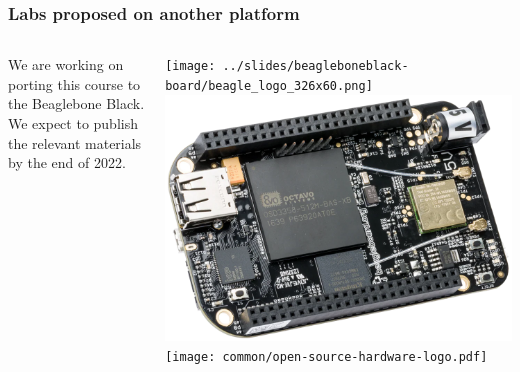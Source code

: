 \begin{frame}
\frametitle{Labs proposed on another platform}
  \begin{columns}
    We are working on porting this course to the Beaglebone Black.\\
    \vspace{1em}
    We expect to publish the relevant materials by the end of 2022.\\
    \begin{center}
      \texttt{[image: ../slides/beagleboneblack-board/beagle\_logo\_326x60.png]}\\
      \includegraphics[width=\textwidth]{../slides/beagleboneblack-board/beagleboneblack.png}\\
      \texttt{[image: common/open-source-hardware-logo.pdf]}
    \end{center}
  \end{columns}
\end{frame}
